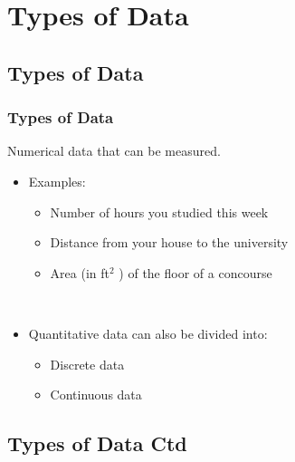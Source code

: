 \documentclass[xcolor=svgnames, compress]{beamer}
\begin{document}
\section{Types of Data}

\subsection*{Types of Data}


\begin{frame}
\frametitle{Types of Data} 

\vspace{-0.25cm}

\begin{definition}
\justifying
Numerical data that can be measured.
\end{definition}


\begin{itemize}

\item	Examples:
	\begin{itemize}\justifying
	\item	Number of hours you studied this week
	\item	Distance from your house to the university
	\item Area (in ft$^{2}$ ) of the floor of a concourse
	\end{itemize}

\hfill\\

\item	Quantitative data can also be divided into:
	\begin{itemize}
	\item	Discrete data
	\item	Continuous data
	\end{itemize}
\end{itemize}

\end{frame}


\subsection*{Types of Data Ctd}
\end{document}
